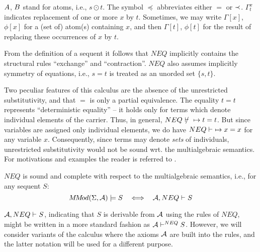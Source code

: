 \noindent
$A$, $B$ stand for atoms, i.e., $s\odot t$.
 The symbol $\preceq$ abbreviates either $=$ or $\mathbin{\prec}$. 
$\Gamma_t^x$ indicates replacement of one or more $x$ by $t$.
Sometimes, we may write $\Gamma[x]$, $\phi[x]$ for a (set of) atom(s) containing
$x$, and then $\Gamma[t]$, $\phi[t]$ for the result of replacing these occurrences
of $x$ by $t$.

%
\begin{REMARK} \label{re:1}
{From the definition of a sequent it follows that $NEQ$ implicitly contains the 
structural rules ``exchange'' and ``contraction''.}
$NEQ$ also assumes implicitly symmetry of equations, i.e., $s=t$ is treated as an 
unorded set $\{s,t\}$. 

Two peculiar features of this calculus are the absence of the unrestricted 
substitutivity,
and that $=$ is only a partial equivalence.
  The equality $t=t$ represents ``deterministic equality'' -- it holds only for terms which
denote individual elements of the carrier.
 Thus, in general, $NEQ\ \not\vdash\ \Seq t=t$. 
But since
variables are assigned only individual elements, we do have 
$NEQ\vdash\ \mathrel{\mapsto} x=x$  for any variable $x$. Consequently, since
terms may denote {\em sets} of individuals, unrestricted substitutivity would not
be sound wrt. the multialgebraic semantics. For motivations and examples the reader
is referred to \cite{WM,Top,Broy}.
\end{REMARK}
%
\begin{THEOREM}\label{th:cmpl} {\em \cite{WM}}
$NEQ$ is sound and complete with respect to the multialgebraic semantics, i.e.,
for any sequent $S$:
\[\MMod(\Sigma,\Ax)\models S \ \ \iff \ \ \der{\Ax, NEQ}{}S\]
\end{THEOREM}
\noindent
 ${{\cal {A}},NEQ}\vdash^{{}}S$,  indicating that $S$ is derivable from ${\cal {A}}$
using the rules of $NEQ$, might be written in a more standard fashion as
 ${\cal {A}}{}\vdash^{{NEQ}}S$. However, we will consider variants of the calculus
 where the axioms ${\cal {A}}$ are built into the rules, and the latter notation will be used
 for a different purpose.

